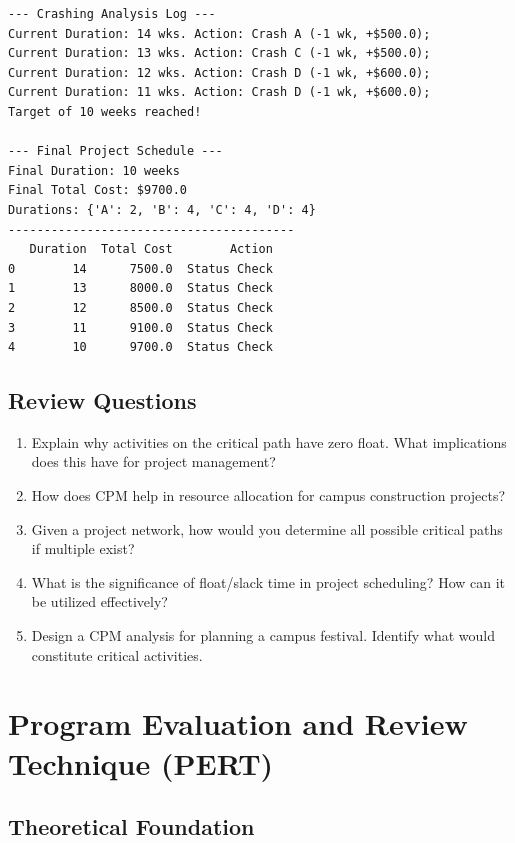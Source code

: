 \documentclass[
  letterpaper,
  DIV=11,
  numbers=noendperiod]{scrreprt}
\begin{document}
\begin{verbatim}
--- Crashing Analysis Log ---
Current Duration: 14 wks. Action: Crash A (-1 wk, +$500.0); 
Current Duration: 13 wks. Action: Crash C (-1 wk, +$500.0); 
Current Duration: 12 wks. Action: Crash D (-1 wk, +$600.0); 
Current Duration: 11 wks. Action: Crash D (-1 wk, +$600.0); 
Target of 10 weeks reached!

--- Final Project Schedule ---
Final Duration: 10 weeks
Final Total Cost: $9700.0
Durations: {'A': 2, 'B': 4, 'C': 4, 'D': 4}
----------------------------------------
   Duration  Total Cost        Action
0        14      7500.0  Status Check
1        13      8000.0  Status Check
2        12      8500.0  Status Check
3        11      9100.0  Status Check
4        10      9700.0  Status Check
\end{verbatim}

\subsection{Review Questions}\label{review-questions-7}

\begin{enumerate}
\def\labelenumi{\arabic{enumi}.}
\item
  Explain why activities on the critical path have zero float. What
  implications does this have for project management?
\item
  How does CPM help in resource allocation for campus construction
  projects?
\item
  Given a project network, how would you determine all possible critical
  paths if multiple exist?
\item
  What is the significance of float/slack time in project scheduling?
  How can it be utilized effectively?
\item
  Design a CPM analysis for planning a campus festival. Identify what
  would constitute critical activities.
\end{enumerate}

\section{Program Evaluation and Review Technique
(PERT)}\label{program-evaluation-and-review-technique-pert}

\subsection{Theoretical Foundation}\label{theoretical-foundation-5}
\end{document}
